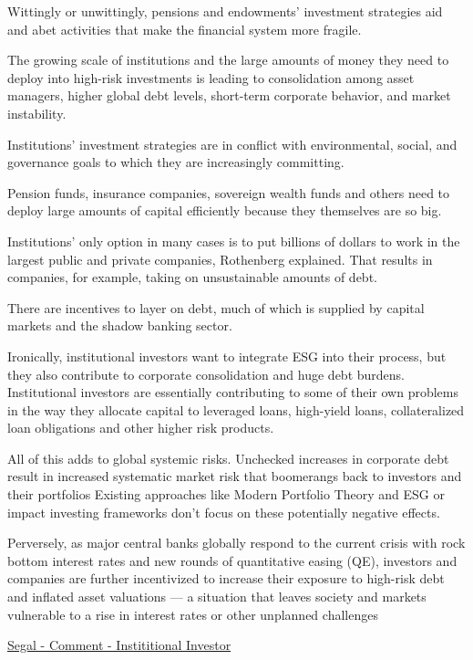 \documentclass[
]{book}
\begin{document}
Wittingly or unwittingly, pensions and endowments' investment strategies aid and abet activities that make the financial system more fragile.

The growing scale of institutions and the large amounts of money they need to deploy into high-risk investments is leading to consolidation among asset managers, higher global debt levels, short-term corporate behavior, and market instability.

Institutions' investment strategies are in conflict with environmental, social, and governance goals to which they are increasingly committing.

Pension funds, insurance companies, sovereign wealth funds and others need to deploy large amounts of capital efficiently because they themselves are so big.

Institutions' only option in many cases is to put billions of dollars to work in the largest public and private companies, Rothenberg explained. That results in companies, for example, taking on unsustainable amounts of debt.

There are incentives to layer on debt, much of which is supplied by capital markets and the shadow banking sector.

Ironically, institutional investors want to integrate ESG into their process, but they also contribute to corporate consolidation and huge debt burdens. Institutional investors are essentially contributing to some of their own problems in the way they allocate capital to leveraged loans, high-yield loans, collateralized loan obligations
and other higher risk products.

All of this adds to global systemic risks.
Unchecked increases in corporate debt result in increased systematic market risk that boomerangs back to investors and their portfolios
Existing approaches like Modern Portfolio Theory and ESG or impact investing frameworks don't focus on these potentially negative effects.

Perversely, as major central banks globally respond to the current crisis with rock bottom interest rates and new rounds of quantitative easing (QE), investors and companies are further incentivized to increase their exposure to high-risk debt and inflated asset valuations --- a situation that leaves society and markets vulnerable to a rise in interest rates or other unplanned challenges

\href{https://www.institutionalinvestor.com/article/b1r9js87jhyn8s/How-Institutional-Investors-Encourage-Corporations-Bad-Behavior}{Segal - Comment - Instititional Investor}
\end{document}
